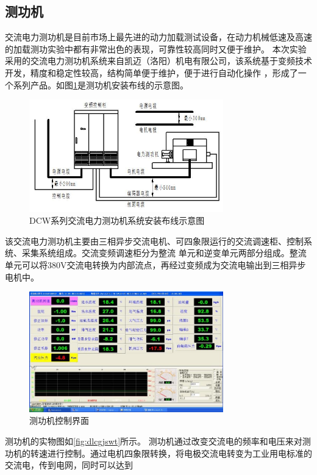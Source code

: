 \subsection{测功机}
交流电力测功机是目前市场上最先进的动力加载测试设备，在动力机械低速及高速的加载测功实验中都有非常出色的表现，可靠性较高同时又便于维护。
本次实验采用的交流电力测功机系统来自凯迈（洛阳）机电有限公司，该系统基于变频技术开发，精度和稳定性较高，结构简单便于维护，便于进行自动化操作
，形成了一个系列产品。如图\ref{fig:dlcgj}是测功机安装布线的示意图。
\begin{figure}[htb]
	\centering
	\includegraphics[width=0.75\textwidth]{thesis_figure/platformer_chapter/dlcgj}
	\caption{DCW系列交流电力测功机系统安装布线示意图}
	\label{fig:dlcgj}
\end{figure}
\par 该交流电力测功机主要由三相异步交流电机、可四象限运行的交流调速柜、控制系统、采集系统组成。交流变频调速柜分为整流
单元和逆变单元两部分组成。整流单元可以将380V交流电转换为内部流点，再经过变频成为交流电输出到三相异步电机中。
\begin{figure}[htb]
	\centering
	\includegraphics[width=0.75\textwidth]{thesis_figure/platformer_chapter/cgjkzjm}
	\caption{测功机控制界面}
	\label{fig:cgjkzjm}
\end{figure}
\par 测功机的实物图如\ref{fig:dlcgjswt}所示。
测功机通过改变交流电的频率和电压来对测功机的转速进行控制。通过电机四象限转换，将电极交流电转变为工业用电标准的交流电，传到电网，同时可以达到
